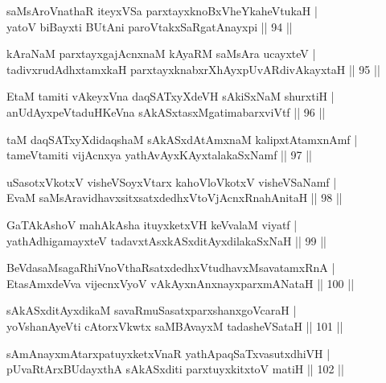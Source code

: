 \begin{shl}
saMsAroV\s nathaR iteyxVSa parxtayxknoBxVheYkaheVtukaH |\\
yatoV biBayxti BUtAni paroVtakxSaRgatAnayxpi \hfill || 94 ||
\end{shl}

\begin{shl}
kAraNaM parxtayxgajAcnxnaM kAyaRM saMsAra ucayxteV |\\
tadivxrudAdhxtamxkaH parxtayxknabxrXhAyxpUvARdivAkayxtaH \hfill || 95 ||
\end{shl}

\begin{shl}
EtaM tamiti vAkeyxVna daqSATxyXdeVH sAkiSxNaM shurxtiH |\\
anUdAyxpeVtaduHKeVna sAkASxtasxMgatimabarxviVtf \hfill || 96 ||
\end{shl}

\begin{shl}
taM daqSATxyXdidaqshaM sAkASxdAtAmxnaM kalipxtAtamxnAmf |\\
tameVtamiti vijAcnxya yathAvAyxKAyxtalakaSxNamf \hfill || 97 ||
\end{shl}

\begin{shl}
uSasotxVkotxV visheVSoyxV\s tarx kahoVloVkotxV visheVSaNamf |\\
EvaM saMsAravidhavxsitxsatxdedhxVtoVjAcnxRnahAnitaH \hfill || 98 ||
\end{shl}

\begin{shl}
GaTAkAshoV mahAkAsha ituyxketxVH keVvalaM viyatf |\\
yathA\s dhigamayxteV tadavxtAsxkASxditAyxdilakaSxNaH \hfill || 99 ||
\end{shl}

\begin{shl}
BeVdasaMsagaRhiVnoV\s thaRsatxdedhxVtudhavxMsavatamxRnA |\\
EtasAmxdeVva vijecnxVyoV vAkAyxnAnxnayxparxmANataH \hfill || 100 ||
\end{shl}

\begin{shl}
sAkASxditAyxdikaM savaRmuSasatxparxshanxgoVcaraH |\\
yoV\s shanAyeVti cAtorxVkwtx saMBAvayxM tadasheVSataH \hfill || 101 ||
\end{shl}

\begin{shl}
sAmAnayxmAtarxpatuyxketxVnaR yathApaqSaTxvasutxdhiVH |\\
pUvaRtArxBUdayxthA sAkASxditi parxtuyxkitxtoV matiH \hfill || 102 ||
\end{shl}

